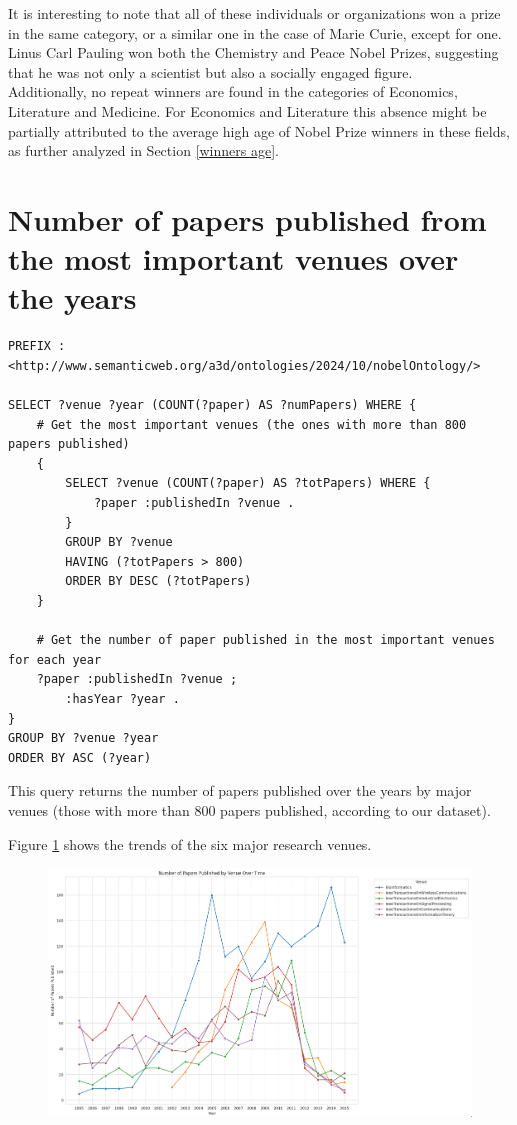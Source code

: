 \documentclass{article}
\begin{document}
It is interesting to note that all of these individuals or organizations won a prize in the same category,
or a similar one in the case of Marie Curie, except for one. Linus Carl Pauling won both the Chemistry and Peace Nobel Prizes,
suggesting that he was not only a scientist but also a socially engaged figure.\\
Additionally, no repeat winners are found in the categories of Economics, Literature and Medicine.
For Economics and Literature this absence might be partially attributed to the average high age of Nobel Prize
winners in these fields, as further analyzed in Section \ref{winners age}.\\

\newpage

\section{Number of papers published from the most important venues over the years}

\begin{lstlisting}
PREFIX : <http://www.semanticweb.org/a3d/ontologies/2024/10/nobelOntology/>

SELECT ?venue ?year (COUNT(?paper) AS ?numPapers) WHERE {
    # Get the most important venues (the ones with more than 800 papers published)
    {
        SELECT ?venue (COUNT(?paper) AS ?totPapers) WHERE {
            ?paper :publishedIn ?venue .
        }
        GROUP BY ?venue
        HAVING (?totPapers > 800)
        ORDER BY DESC (?totPapers)
    }

    # Get the number of paper published in the most important venues for each year
    ?paper :publishedIn ?venue ;
        :hasYear ?year .
}
GROUP BY ?venue ?year
ORDER BY ASC (?year)
\end{lstlisting}

\vspace{1em}

This query returns the number of papers published over the years by major
venues (those with more than 800 papers published, according to our dataset).

Figure \ref{fig:papersPerVenue} shows the trends of the six major research venues.

\begin{figure}[H]
	\centering
	\label{fig:papersPerVenue}
	\includegraphics[width=\textwidth]{../queries/plots/papersPerVenue.png}
\end{figure}
\end{document}
